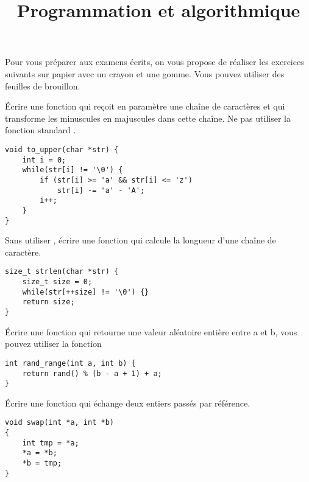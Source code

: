 \documentclass[french,a4paper,addpoints,11pt]{exam}
\title{Programmation et algorithmique}
\begin{document}
\maketitle
\thispagestyle{headandfoot}

Pour vous préparer aux examens écrits, on vous propose de réaliser les exercices suivants sur papier avec un crayon et une gomme. Vous pouvez utiliser des feuilles de brouillon.

\begin{questions}

\question Écrire une fonction qui reçoit en paramètre une chaîne de caractères et qui transforme les minuscules en majuscules dans cette chaîne. Ne pas utiliser la fonction standard .

\begin{solutionordottedlines}[6cm]
\begin{lstlisting}
void to_upper(char *str) {
    int i = 0;
    while(str[i] != '\0') {
        if (str[i] >= 'a' && str[i] <= 'z')
            str[i] -= 'a' - 'A';
        i++;
    }
}
\end{lstlisting}
\end{solutionordottedlines}

\question Sans utiliser , écrire une fonction qui calcule la longueur d'une chaîne de caractère.

\begin{solutionordottedlines}[5cm]
\begin{lstlisting}
size_t strlen(char *str) {
    size_t size = 0;
    while(str[++size] != '\0') {}
    return size;
}
\end{lstlisting}
\end{solutionordottedlines}

\question Écrire une fonction qui retourne une valeur aléatoire entière entre a et b, vous pouvez utiliser la fonction 

\begin{solutionordottedlines}[3cm]
\begin{lstlisting}
int rand_range(int a, int b) {
    return rand() % (b - a + 1) + a;
}
\end{lstlisting}
\end{solutionordottedlines}

\question Écrire une fonction qui échange deux entiers passés par référence.

\begin{solutionordottedlines}[7cm]
\begin{lstlisting}
void swap(int *a, int *b)
{
    int tmp = *a;
    *a = *b;
    *b = tmp;
}
\end{lstlisting}
\end{solutionordottedlines}


\end{questions}
\end{document}
